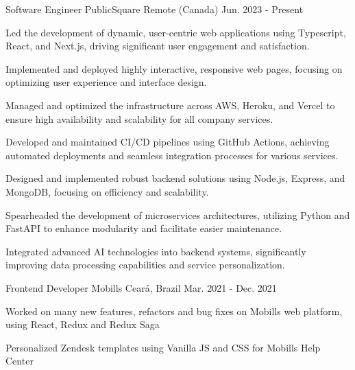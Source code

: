 

\begin{cventries}

\cventry
{Software Engineer} %
{PublicSquare} %
{Remote (Canada)} %
{Jun. 2023 - Present} %
{
  \begin{cvitems} %
    \item{Led the development of dynamic, user-centric web applications using Typescript, React, and Next.js, driving significant user engagement and satisfaction.}
    \item{Implemented and deployed highly interactive, responsive web pages, focusing on optimizing user experience and interface design.}
    \item {Managed and optimized the infrastructure across AWS, Heroku, and Vercel to ensure high availability and scalability for all company services.}
    \item{Developed and maintained CI/CD pipelines using GitHub Actions, achieving automated deployments and seamless integration processes for various services.}
    \item{Designed and implemented robust backend solutions using Node.js, Express, and MongoDB, focusing on efficiency and scalability.}
    \item{Spearheaded the development of microservices architectures, utilizing Python and FastAPI to enhance modularity and facilitate easier maintenance.}
    \item{Integrated advanced AI technologies into backend systems, significantly improving data processing capabilities and service personalization.}
  \end{cvitems}
}

\cventry
{Frontend Developer} %
{Mobills} %
{Ceará, Brazil} %
{Mar. 2021 - Dec. 2021} %
{
  \begin{cvitems} %
    \item {Worked on many new features,
    refactors and bug fixes on Mobills
    web platform, using React, Redux
    and Redux Saga}
    \item {Personalized Zendesk templates
    using Vanilla JS and CSS for
    Mobills Help Center}
  \end{cvitems}
}


\end{cventries}
